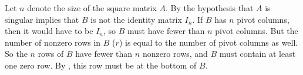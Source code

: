 Let $n$ denote the size of the square matrix $A$.  By  the hypothesis that $A$ is singular implies that $B$ is not the identity matrix $I_n$.  If $B$ has $n$ pivot columns, then it would have to be $I_n$, so $B$ must have fewer than $n$ pivot columns.  But the number of nonzero rows in $B$ ($r$) is equal to the number of pivot columns as well.  So the $n$ rows of $B$ have fewer than $n$ nonzero rows, and $B$ must contain at least one zero row.  By , this row must be at the bottom of $B$.
